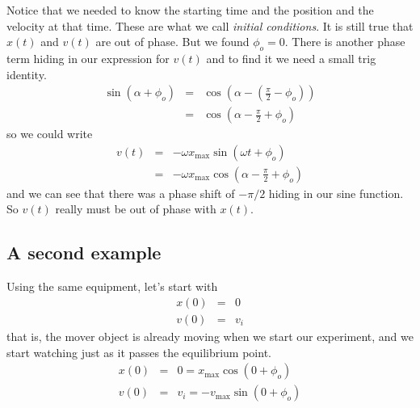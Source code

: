 \documentclass{book}
\begin{document}
Notice that we needed to know the starting time and the position and the
velocity at that time. These are what we call \emph{initial conditions}. It
is still true that $x\left( t\right) $ and $v\left( t\right) $ are out of
phase. But we found $\phi _{o}=0.$ There is another phase term hiding in our
expression for $v\left( t\right) $ and to find it we need a small trig
identity.%
\begin{eqnarray*}
\sin \left( \alpha +\phi _{o}\right) &=&\cos \left( \alpha -\left( \frac{\pi 
}{2}-\phi _{o}\right) \right) \\
&=&\cos \left( \alpha -\frac{\pi }{2}+\phi _{o}\right)
\end{eqnarray*}%
so we could write 
\begin{eqnarray*}
v\left( t\right) &=&-\omega x_{\max }\sin \left( \omega t+\phi _{o}\right) \\
&=&-\omega x_{\max }\cos \left( \alpha -\frac{\pi }{2}+\phi _{o}\right)
\end{eqnarray*}%
and we can see that there was a phase shift of $-\pi /2$ hiding in our sine
function. So $v\left( t\right) $ really must be out of phase with $x\left(
t\right) .$

\subsection{A second example}


Using the same equipment, let's start with 
\begin{eqnarray*}
x\left( 0\right) &=&0 \\
v\left( 0\right) &=&v_{i}
\end{eqnarray*}%
that is, the mover object is already moving when we start our experiment,
and we start watching just as it passes the equilibrium point.%
\begin{eqnarray*}
x\left( 0\right) &=&0=x_{\max }\cos \left( 0+\phi _{o}\right) \\
v\left( 0\right) &=&v_{i}=-v_{\max }\sin \left( 0+\phi _{o}\right)
\end{eqnarray*}
\end{document}
